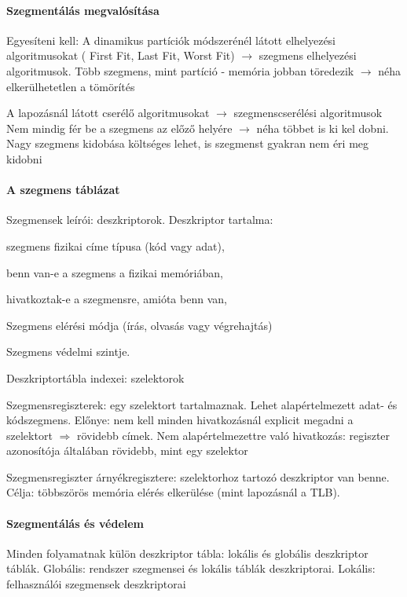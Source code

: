 \documentclass[fleqn,10pt,a4paper]{article}
\newcommand{\nn}{\Rightarrow}
\theoremstyle{magyar}
\begin{document}
  \paragraph{Szegmentálás megvalósítása}
  
  Egyesíteni kell:  A dinamikus partíciók módszerénél látott elhelyezési algoritmusokat ( First Fit, Last Fit, Worst
  Fit) $\to$ szegmens elhelyezési algoritmusok. Több szegmens, mint partíció - memória jobban töredezik $\to$ néha
  elkerülhetetlen a tömörítés
  
  A lapozásnál látott cserélő algoritmusokat $\to$ szegmenscserélési algoritmusok \\
  Nem mindig fér be a szegmens az előző helyére $\to$ néha többet is ki kel dobni. Nagy szegmens kidobása költséges
  lehet, is szegmenst gyakran nem éri meg kidobni

  \paragraph{A szegmens táblázat}

  Szegmensek leírói: deszkriptorok. Deszkriptor tartalma:
  \begin{inparaenum}[\itshape a)]
  \item szegmens fizikai címe típusa (kód vagy adat),
  \item benn van-e a szegmens a fizikai memóriában,
  \item hivatkoztak-e a szegmensre, amióta benn van,
  \item Szegmens elérési módja (írás, olvasás vagy végrehajtás) 
  \item Szegmens védelmi szintje.
  \end{inparaenum}  
  Deszkriptortábla indexei: szelektorok
  
  Szegmensregiszterek: egy szelektort tartalmaznak. Lehet alapértelmezett adat- és kódszegmens. Előnye: nem kell minden
  hivatkozásnál explicit megadni a szelektort $\nn$ rövidebb címek. Nem alapértelmezettre való hivatkozás: regiszter
  azonosítója általában rövidebb, mint egy szelektor
  
  Szegmensregiszter árnyékregisztere: szelektorhoz tartozó deszkriptor van benne. Célja: többszörös memória elérés
  elkerülése (mint lapozásnál a TLB).
  

  \paragraph{Szegmentálás és védelem}  
  Minden folyamatnak külön deszkriptor tábla: lokális és globális deszkriptor táblák. Globális: rendszer szegmensei és
  lokális táblák deszkriptorai. Lokális: felhasználói szegmensek deszkriptorai 
  
\end{document}
